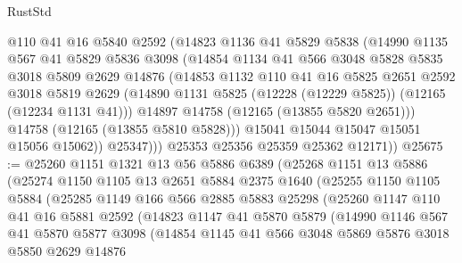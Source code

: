 \begin{lexlean}{RustStd}
\begin{coremodule}
              @110
              @41
              @16
              @5840
              @2592
              (@14823
                @1136
                @41
                @5829
                @5838
                (@14990
                  @1135
                  @567
                  @41
                  @5829
                  @5836
                  @3098
                  (@14854
                    @1134
                    @41
                    @566
                    @3048
                    @5828
                    @5835
                    @3018
                    @5809
                    @2629
                    @14876
                    (@14853
                      @1132
                      @110
                      @41
                      @16
                      @5825
                      @2651
                      @2592
                      @3018
                      @5819
                      @2629
                      (@14890 @1131 @5825 (@12228 (@12229 @5825)) (@12165 (@12234 @1131 @41)))
                      @14897
                      @14758
                      (@12165 (@13855 @5820 @2651)))
                    @14758
                    (@12165 (@13855 @5810 @5828)))
                  @15041
                  @15044
                  @15047
                  @15051
                  @15056
                  @15062))
              @25347)))
        @25353
        @25356
        @25359
        @25362
        @12171))
@25675 := @25260
    @1151
    @1321
    @13
    @56
    @5886
    @6389
    (@25268
      @1151
      @13
      @5886
      (@25274
        @1150
        @1105
        @13
        @2651
        @5884
        @2375
        @1640
        (@25255
          @1150
          @1105
          @5884
          (@25285
            @1149
            @166
            @566
            @2885
            @5883
            @25298
            (@25260
              @1147
              @110
              @41
              @16
              @5881
              @2592
              (@14823
                @1147
                @41
                @5870
                @5879
                (@14990
                  @1146
                  @567
                  @41
                  @5870
                  @5877
                  @3098
                  (@14854
                    @1145
                    @41
                    @566
                    @3048
                    @5869
                    @5876
                    @3018
                    @5850
                    @2629
                    @14876

\end{coremodule}
\end{lexlean}
